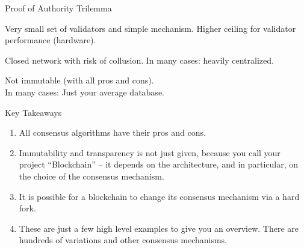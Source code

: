 \documentclass[handout]{beamer}
\begin{document}
	\begin{frame}{Proof of Authority Trilemma}
		\begin{center}
			\begin{tikzpicture}[scale=0.6, every node/.style ={scale=0.8}]
				
			\end{tikzpicture}
		\end{center}
		
		\begin{description}[labelwidth=10em]
			\item[\textbf{Scalability}] Very small set of validators and simple mechanism. Higher ceiling for validator performance (hardware).
			\item[\textbf{Decentralization}] Closed network with risk of collusion. In many cases: heavily centralized. 
			\item[\textbf{Security}] Not immutable (with all pros and cons).\\ In many cases: Just your average database.
		\end{description}
	\end{frame}
	
	\begin{frame}{Key Takeaways}
		\begin{enumerate}
			\item All consensus algorithms have their pros and cons. 
			\item<2-> Immutability and transparency is not just given, because you call your project ``Blockchain'' -- it depends on the architecture, and in particular, on the choice of the consensus mechanism.
			\item<3-> It is possible for a blockchain to change its consensus mechanism via a hard fork.	
			\item<4-> These are just a few high level examples to give you an overview. There are hundreds of variations and other consensus mechanisms.
		\end{enumerate}
	\end{frame}
	
\end{document}
